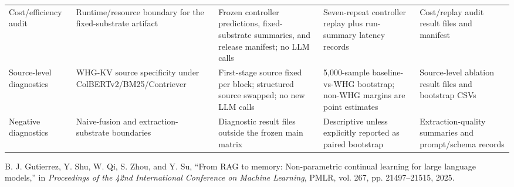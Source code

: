 \documentclass[conference]{IEEEtran}
\begin{document}
\begin{table}[t]
\begin{tabular}{@{}L{0.16\textwidth}L{0.22\textwidth}L{0.19\textwidth}L{0.20\textwidth}L{0.17\textwidth}@{}}
Cost/efficiency audit & Runtime/resource boundary for the fixed-substrate artifact & Frozen controller predictions, fixed-substrate summaries, and release manifest; no LLM calls & Seven-repeat controller replay plus run-summary latency records & Cost/replay audit result files and manifest \\
Source-level diagnostics & WHG-KV source specificity under ColBERTv2/BM25/Contriever & First-stage source fixed per block; structured source swapped; no new LLM calls & 5,000-sample baseline-vs-WHG bootstrap; non-WHG margins are point estimates & Source-level ablation result files and bootstrap CSVs \\
Negative diagnostics & Naive-fusion and extraction-substrate boundaries & Diagnostic result files outside the frozen main matrix & Descriptive unless explicitly reported as paired bootstrap & Extraction-quality summaries and prompt/schema records \\
\bottomrule
\end{tabular}
\end{table}

\begin{thebibliography}{1}

B. J. Gutierrez, Y. Shu, W. Qi, S. Zhou, and Y. Su, ``From RAG to memory: Non-parametric continual learning for large language models,'' in \emph{Proceedings of the 42nd International Conference on Machine Learning}, PMLR, vol. 267, pp. 21497--21515, 2025.

\end{thebibliography}
\end{document}
